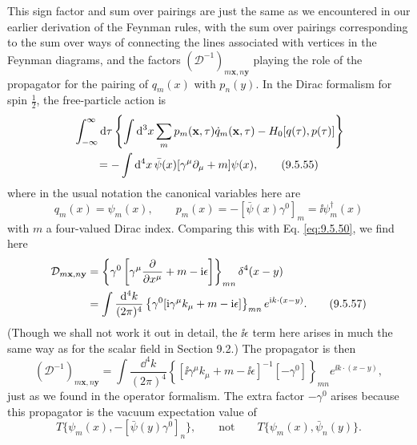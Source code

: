 This sign factor and sum over pairings are just the same as we encountered in
our earlier derivation of the Feynman rules, with the sum over pairings
corresponding to the sum over ways of connecting the lines associated with
vertices in the Feynman diagrams, and the factors
$(\mathcal{D}^{-1})_{m\mathbf{x},n\mathbf{y}}$ playing the role of the
propagator for the pairing of $q_m(x)$ with $p_n(y)$. In the Dirac formalism
for spin $\frac12$, the free-particle action is
\begin{align}
&\int_{-\infty}^{\infty}\mathop{}\!\mathrm{d}\tau
 \left\{\int \mathop{}\!\mathrm{d}^3x\sum_mp_m(\mathbf{x},\tau)\dot q_m(\mathbf{x},\tau)
 -H_0[q(\tau),p(\tau)]\right\}
\notag\\
&\qquad=-\int \mathop{}\!\mathrm{d}^4x\,\bar\psi(x)
 [\gamma^\mu\partial_\mu+m]\psi(x),
\tag{9.5.55}\label{eq:9.5.55}
\end{align}
where in the usual notation the canonical variables here are
\begin{equation}
q_m(x)=\psi_m(x),
\qquad
p_m(x)=-[\bar\psi(x)\gamma^0]_m=\ii\psi_m^\dagger(x)
\tag{9.5.56}\label{eq:9.5.56}
\end{equation}
with $m$ a four-valued Dirac index. Comparing this with Eq. \eqref{eq:9.5.50}, we find
here
\begin{align}
\mathcal{D}_{m\mathbf{x},n\mathbf{y}}
&=\left\{\gamma^0\left[\gamma^\mu\frac{\partial}{\partial x^\mu}
 +m-\mathrm{i}\epsilon\right]\right\}_{mn}
 \delta^4(x-y)\notag\\
&=\int\frac{\mathop{}\!\mathrm{d}^4k}{(2\pi)^4}
 \left\{\gamma^0[\mathrm{i}\gamma^\mu k_\mu+m-\mathrm{i}\epsilon]\right\}_{mn}
 e^{\mathrm{i} k\cdot(x-y)}.
\tag{9.5.57}\label{eq:9.5.57}
\end{align}
(Though we shall not work it out in detail, the $\ii\epsilon$ term here arises
in much the same way as for the scalar field in Section 9.2.) The propagator is
then
\begin{equation}
(\mathcal{D}^{-1})_{m\mathbf{x},n\mathbf{y}}
=\int\frac{\dd^4k}{(2\pi)^4}
 \left\{[\ii\gamma^\mu k_\mu+m-\ii\epsilon]^{-1}[-\gamma^0]\right\}_{mn}
 e^{\ii k\cdot(x-y)},
\tag{9.5.58}\label{eq:9.5.58}
\end{equation}
just as we found in the operator formalism. The extra factor $-\gamma^0$
arises because this propagator is the vacuum expectation value of
\[
T\{\psi_m(x),-[\bar\psi(y)\gamma^0]_n\},
\qquad\text{not}\qquad
T\{\psi_m(x),\bar\psi_n(y)\}.
\]

